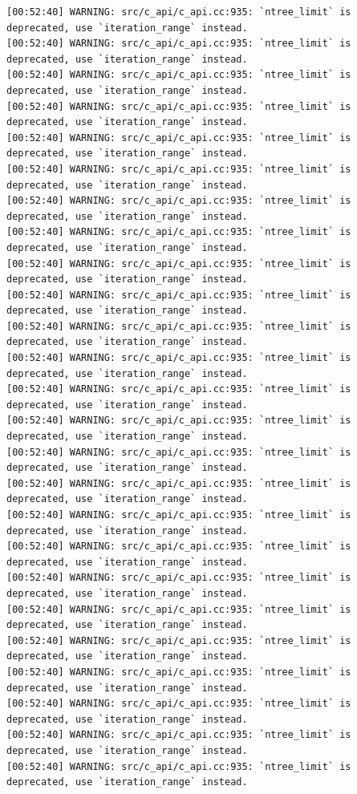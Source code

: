 \documentclass[
  letterpaper,
  DIV=11,
  numbers=noendperiod]{scrartcl}
\begin{document}
\begin{verbatim}
[00:52:40] WARNING: src/c_api/c_api.cc:935: `ntree_limit` is deprecated, use `iteration_range` instead.
[00:52:40] WARNING: src/c_api/c_api.cc:935: `ntree_limit` is deprecated, use `iteration_range` instead.
[00:52:40] WARNING: src/c_api/c_api.cc:935: `ntree_limit` is deprecated, use `iteration_range` instead.
[00:52:40] WARNING: src/c_api/c_api.cc:935: `ntree_limit` is deprecated, use `iteration_range` instead.
[00:52:40] WARNING: src/c_api/c_api.cc:935: `ntree_limit` is deprecated, use `iteration_range` instead.
[00:52:40] WARNING: src/c_api/c_api.cc:935: `ntree_limit` is deprecated, use `iteration_range` instead.
[00:52:40] WARNING: src/c_api/c_api.cc:935: `ntree_limit` is deprecated, use `iteration_range` instead.
[00:52:40] WARNING: src/c_api/c_api.cc:935: `ntree_limit` is deprecated, use `iteration_range` instead.
[00:52:40] WARNING: src/c_api/c_api.cc:935: `ntree_limit` is deprecated, use `iteration_range` instead.
[00:52:40] WARNING: src/c_api/c_api.cc:935: `ntree_limit` is deprecated, use `iteration_range` instead.
[00:52:40] WARNING: src/c_api/c_api.cc:935: `ntree_limit` is deprecated, use `iteration_range` instead.
[00:52:40] WARNING: src/c_api/c_api.cc:935: `ntree_limit` is deprecated, use `iteration_range` instead.
[00:52:40] WARNING: src/c_api/c_api.cc:935: `ntree_limit` is deprecated, use `iteration_range` instead.
[00:52:40] WARNING: src/c_api/c_api.cc:935: `ntree_limit` is deprecated, use `iteration_range` instead.
[00:52:40] WARNING: src/c_api/c_api.cc:935: `ntree_limit` is deprecated, use `iteration_range` instead.
[00:52:40] WARNING: src/c_api/c_api.cc:935: `ntree_limit` is deprecated, use `iteration_range` instead.
[00:52:40] WARNING: src/c_api/c_api.cc:935: `ntree_limit` is deprecated, use `iteration_range` instead.
[00:52:40] WARNING: src/c_api/c_api.cc:935: `ntree_limit` is deprecated, use `iteration_range` instead.
[00:52:40] WARNING: src/c_api/c_api.cc:935: `ntree_limit` is deprecated, use `iteration_range` instead.
[00:52:40] WARNING: src/c_api/c_api.cc:935: `ntree_limit` is deprecated, use `iteration_range` instead.
[00:52:40] WARNING: src/c_api/c_api.cc:935: `ntree_limit` is deprecated, use `iteration_range` instead.
[00:52:40] WARNING: src/c_api/c_api.cc:935: `ntree_limit` is deprecated, use `iteration_range` instead.
[00:52:40] WARNING: src/c_api/c_api.cc:935: `ntree_limit` is deprecated, use `iteration_range` instead.
[00:52:40] WARNING: src/c_api/c_api.cc:935: `ntree_limit` is deprecated, use `iteration_range` instead.
[00:52:40] WARNING: src/c_api/c_api.cc:935: `ntree_limit` is deprecated, use `iteration_range` instead.

\end{verbatim}
\end{document}
